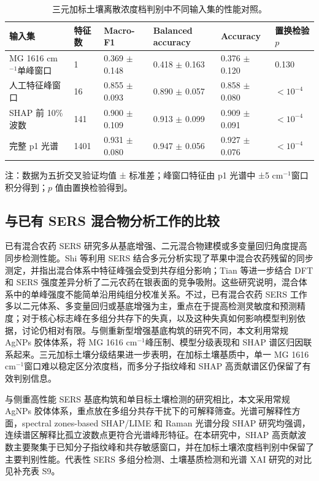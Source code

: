 \documentclass[preprint,12pt]{elsarticle}
\newcommand{\cmone}{cm$^{-1}$}
\begin{document}
\begin{table}[!htbp]
\centering
\caption{三元加标土壤离散浓度档判别中不同输入集的性能对照。}
\label{tab:soil_g}
\footnotesize
\setlength{\tabcolsep}{3pt}
\begin{tabularx}{\textwidth}{L{3.15cm}L{1.45cm}L{2.15cm}L{2.15cm}L{2.05cm}L{1.75cm}}
\toprule
输入集 & 特征数 & Macro-F1 & Balanced accuracy & Accuracy & 置换检验 \(p\) \\
\midrule
MG 1616 \cmone 单峰窗口 & 1 & 0.369 $\pm$ 0.148 & 0.418 $\pm$ 0.163 & 0.376 $\pm$ 0.120 & 0.130 \\
人工特征峰窗口 & 16 & 0.855 $\pm$ 0.093 & 0.890 $\pm$ 0.057 & 0.858 $\pm$ 0.080 & $<10^{-4}$ \\
SHAP 前 10\% 波数 & 141 & 0.900 $\pm$ 0.109 & 0.913 $\pm$ 0.099 & 0.909 $\pm$ 0.091 & $<10^{-4}$ \\
完整 p1 光谱 & 1401 & 0.931 $\pm$ 0.080 & 0.947 $\pm$ 0.056 & 0.927 $\pm$ 0.076 & $<10^{-4}$ \\
\bottomrule
\end{tabularx}
\begin{flushleft}
\footnotesize 注：数据为五折交叉验证均值 ± 标准差；峰窗口特征由 p1 光谱中 ±5 \cmone 窗口积分得到；\(p\) 值由置换检验得到。
\end{flushleft}
\end{table}
\FloatBarrier

\subsection{与已有 SERS 混合物分析工作的比较}

已有混合农药 SERS 研究多从基底增强、二元混合物建模或多变量回归角度提高同步检测性能。Shi 等利用 SERS 结合多元分析实现了苹果中混合农药残留的同步测定，并指出混合体系中特征峰强会受到共存组分影响\cite{ref2}；Tian 等进一步结合 DFT 和 SERS 强度差异分析了二元农药在银表面的竞争吸附\cite{ref3}。这些研究说明，混合体系中的单峰强度不能简单沿用纯组分校准关系。不过，已有混合农药 SERS 工作多以二元体系、多变量回归或基底增强为主，重点在于提高检测灵敏度和预测精度；对于核心标志峰在多组分共存下的失真，以及这种失真如何影响模型判别依据，讨论仍相对有限。与侧重新型增强基底构筑的研究不同，本文利用常规 AgNPs 胶体体系，将 MG 1616 \cmone 峰压制、模型分级表现和 SHAP 谱区归因联系起来。三元加标土壤分级结果进一步表明，在加标土壤基质中，单一 MG 1616 \cmone 窗口难以稳定区分浓度档，而多分子指纹峰和 SHAP 高贡献谱区仍保留了有效判别信息。

与侧重高性能 SERS 基底构筑和单目标土壤检测的研究相比\cite{ref6}，本文采用常规 AgNPs 胶体体系，重点放在多组分共存干扰下的可解释筛查。光谱可解释性方面，spectral zones-based SHAP/LIME 和 Raman 光谱分段 SHAP 研究均强调，连续谱区解释比孤立波数点更符合光谱峰形特征\cite{ref8,ref9}。在本研究中，SHAP 高贡献波数主要聚集于已知分子指纹峰和共存敏感窗口，并在加标土壤浓度档判别中保留了主要判别性能。代表性 SERS 多组分检测、土壤基质检测和光谱 XAI 研究的对比见补充表 S9。
\end{document}
